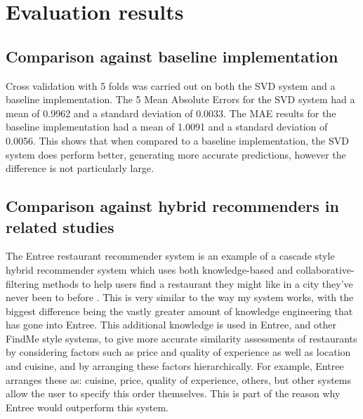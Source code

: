 \documentclass[conference]{IEEEtran}
\begin{document}
\section{Evaluation results}

\subsection{Comparison against baseline implementation}
Cross validation with 5 folds was carried out on both the SVD system and a baseline implementation. 
The 5 Mean Absolute Errors for the SVD system had a mean of 0.9962 and a standard deviation of 0.0033. 
The MAE results for the baseline implementation had a mean of 1.0091 and a standard deviation of 0.0056. 
This shows that when compared to a baseline implementation, the SVD system does perform better, generating more 
accurate predictions, however the difference is not particularly large. 

\subsection{Comparison against hybrid recommenders in related studies}
The Entree restaurant recommender system is an example of a cascade style hybrid recommender system which 
uses both knowledge-based and collaborative-filtering methods to help users find a restaurant they might like in 
a city they've never been to before \cite{burke1999integrating,burke2000knowledge,burke2002hybrid,burke2007hybrid}. 
This is very similar to the way my system works, with the biggest difference being the vastly greater amount of 
knowledge engineering that has gone into Entree. 
This additional knowledge is used in Entree, and other FindMe style systems, to give more accurate similarity assessments 
of restaurants by considering factors such as price and quality of experience as well as location and cuisine, 
and by arranging these factors hierarchically. 
For example, Entree arranges these as: cuisine, price, quality of experience, others, but other systems allow the 
user to specify this order themselves. 
This is part of the reason why Entree would outperform this system. 
\end{document}

